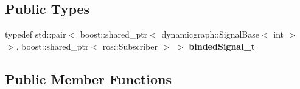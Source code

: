 \subsection*{Public Types}
\begin{DoxyCompactItemize}
\item 
typedef std\+::pair$<$ boost\+::shared\+\_\+ptr$<$ dynamicgraph\+::\+Signal\+Base$<$ int $>$ $>$, boost\+::shared\+\_\+ptr$<$ ros\+::\+Subscriber $>$ $>$ {\bfseries binded\+Signal\+\_\+t}\hypertarget{classdynamic__graph_1_1RosSubscribe_a28c2e1e9ba1e6e242720086ab77e7b6f}{}\label{classdynamic__graph_1_1RosSubscribe_a28c2e1e9ba1e6e242720086ab77e7b6f}

\end{DoxyCompactItemize}
\subsection*{Public Member Functions}
